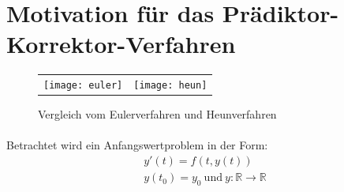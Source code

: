 \documentclass{listhesis}
\begin{document}
\section{Motivation für das Prädiktor-Korrektor-Verfahren} \label{section:PK}

\begin{figure}[!h]
\centering
\begin{tabular}{@{}cc@{}}
\texttt{[image: euler]}&
\texttt{[image: heun]}
\end{tabular}
\caption{Vergleich vom Eulerverfahren und Heunverfahren}
\label{fig:motivation}
\end{figure}

\paragraph{}
Betrachtet wird ein Anfangswertproblem in der Form:
\begin{gather*}
y'(t) = f(t,y(t))\\ y(t_0) = y_0\: \text{und}\: y:\mathbb{R}\rightarrow\mathbb{R}
\end{gather*}
\end{document}
